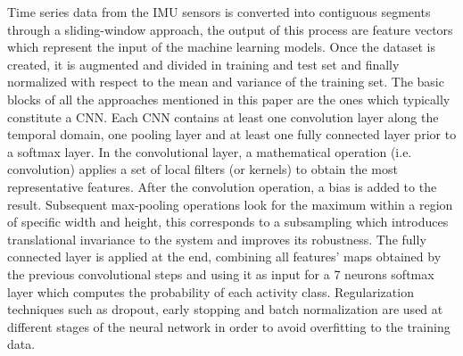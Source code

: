 Time series data from the IMU sensors is converted into contiguous segments through a \mbox{sliding-window} approach, the output of this process are feature vectors which represent the input of the machine learning models. Once the dataset is created, it is augmented and divided in training and test set and finally normalized with respect to the mean and variance of the training set. The basic blocks of all the approaches mentioned in this paper are the ones which typically constitute a CNN. Each CNN contains at least one convolution layer along the temporal domain, one pooling layer and at least one fully connected layer prior to a softmax layer. In the convolutional layer, a mathematical operation (i.e. convolution) applies a set of local filters (or kernels) to obtain the most representative features. After the convolution operation, a bias is added to the result. Subsequent \mbox{max-pooling} operations look for the maximum within a region of specific width and height, this corresponds to a subsampling which introduces translational invariance to the system and improves its robustness. The fully connected layer is applied at the end, combining all features' maps obtained by the previous convolutional steps and using it as input for a 7 neurons softmax layer which computes the probability of each activity class. Regularization techniques such as dropout, early stopping and batch normalization are used at different stages of the neural network in order to avoid overfitting to the training data. \par
